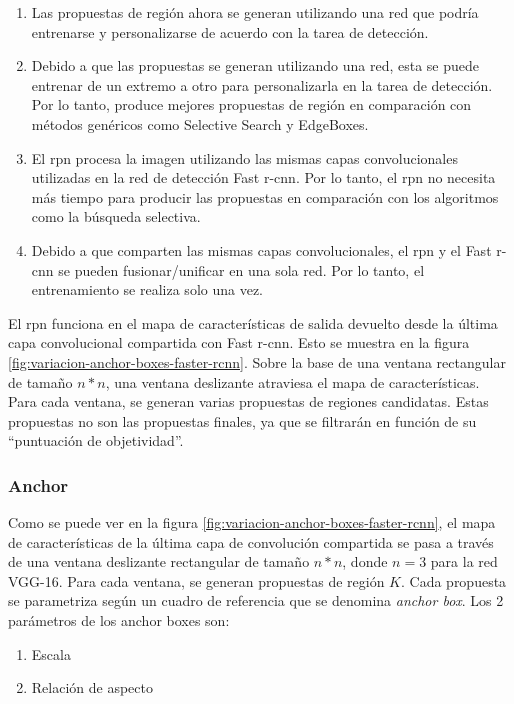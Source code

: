 \begin{enumerate}
    \item Las propuestas de región ahora se generan utilizando una red que podría entrenarse y personalizarse de acuerdo con la tarea de detección.
    \item Debido a que las propuestas se generan utilizando una red, esta se puede entrenar de un extremo a otro para personalizarla en la tarea de detección. Por lo tanto, produce mejores propuestas de región en comparación con métodos genéricos como Selective Search y EdgeBoxes.
    \item El \gls{rpn} procesa la imagen utilizando las mismas capas convolucionales utilizadas en la red de detección Fast \gls{r-cnn}. Por lo tanto, el \gls{rpn} no necesita más tiempo para producir las propuestas en comparación con los algoritmos como la búsqueda selectiva.
    \item Debido a que comparten las mismas capas convolucionales, el \gls{rpn} y el Fast \gls{r-cnn} se pueden fusionar/unificar en una sola red. Por lo tanto, el entrenamiento se realiza solo una vez.
\end{enumerate}

El \gls{rpn} funciona en el mapa de características de salida devuelto desde la última capa convolucional compartida con Fast \gls{r-cnn}. Esto se muestra en la figura \ref{fig:variacion-anchor-boxes-faster-rcnn}. Sobre la base de una ventana rectangular de tamaño $n*n$, una ventana deslizante atraviesa el mapa de características. Para cada ventana, se generan varias propuestas de regiones candidatas. Estas propuestas no son las propuestas finales, ya que se filtrarán en función de su ``puntuación de objetividad''.

\subsubsection*{Anchor}
\label{subsubsec:anchor-faster-rcnn}

Como se puede ver en la figura \ref{fig:variacion-anchor-boxes-faster-rcnn}, el mapa de características de la última capa de convolución compartida se pasa a través de una ventana deslizante rectangular de tamaño $n*n$, donde $n = 3$ para la red VGG-16. Para cada ventana, se generan propuestas de región $K$. Cada propuesta se parametriza según un cuadro de referencia que se denomina \textit{anchor box}. Los 2 parámetros de los anchor boxes son:

\begin{enumerate}
    \item Escala
    \item Relación de aspecto
\end{enumerate}

